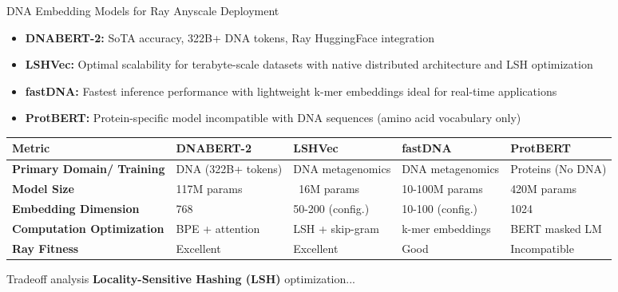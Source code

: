 \documentclass[aspectratio=169]{beamer}
\begin{document}
\begin{frame}{DNA Embedding Models for Ray Anyscale Deployment}

\begin{itemize}
    \item \textbf{DNABERT-2:} SoTA accuracy, 322B+ DNA tokens, Ray HuggingFace integration
    \item \textbf{LSHVec:} Optimal scalability for terabyte-scale datasets with native distributed architecture and LSH optimization
    \item \textbf{fastDNA:} Fastest inference performance with lightweight k-mer embeddings ideal for real-time applications
    \item \textbf{ProtBERT:} Protein-specific model incompatible with DNA sequences (amino acid vocabulary only)
\end{itemize}

\vfill

\begin{table}[b]
\centering
\tiny
\begin{tabular}{|p{2.2cm}|p{2.0cm}|p{2.0cm}|p{2.0cm}|p{2.0cm}|}
\hline
\textbf{Metric} & \textbf{DNABERT-2} & \textbf{LSHVec} & \textbf{fastDNA} & \textbf{ProtBERT} \\
\hline
\textbf{Primary Domain/ Training} & DNA (322B+ tokens) & DNA metagenomics & DNA metagenomics & Proteins (No DNA) \\
\hline
\textbf{Model Size} & 117M params & ~16M params & 10-100M params & 420M params \\
\hline
\textbf{Embedding Dimension} & 768 & 50-200 (config.) & 10-100 (config.) & 1024 \\
\hline
\textbf{Computation Optimization} & BPE + attention & LSH + skip-gram & k-mer embeddings & BERT masked LM \\
\hline
\textbf{Ray Fitness} & Excellent & Excellent & Good & Incompatible \\
\hline
\end{tabular}
\end{table}

    \vspace{0.3cm}
    \begin{block}{Tradeoff analysis}
        \textbf{Locality-Sensitive Hashing (LSH)} optimization...
    \end{block}

\end{frame}
\end{document}
